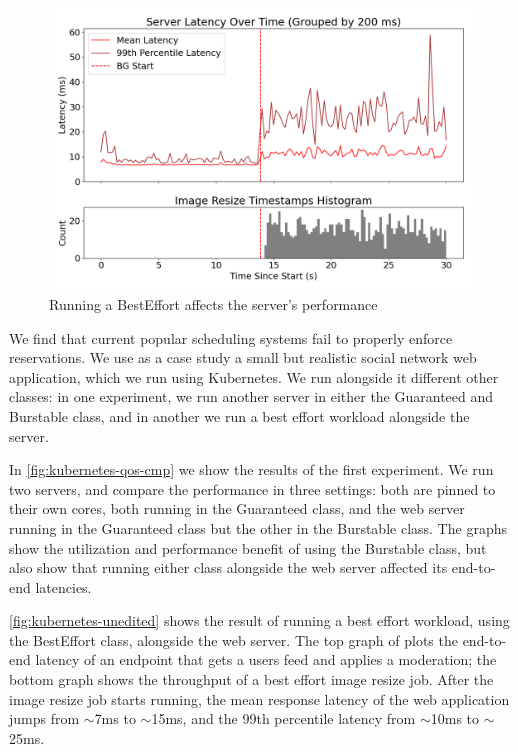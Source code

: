 \begin{figure}[t]
    \centering
    \includegraphics[width=\columnwidth]{graphs/kubernetes-unedited.png}
    \caption{Running a BestEffort affects the server's
    performance}\label{fig:kubernetes-unedited}
\end{figure}

We find that current popular scheduling systems fail to properly enforce
reservations. We use as a case study a small but realistic social network web
application, which we run using Kubernetes. We run alongside it different other
classes: in one experiment, we run another server in either the Guaranteed and
Burstable class, and in another we run a best effort workload alongside the
server. 

In \autoref{fig:kubernetes-qos-cmp} we show the results of the first experiment.
We run two servers, and compare the performance in three settings: both are
pinned to their own cores, both running in the Guaranteed class, and the web
server running in the Guaranteed class but the other in the Burstable class. The
graphs show the utilization and performance benefit of using the Burstable
class, but also show that running either class alongside the web server affected
its end-to-end latencies.

\autoref{fig:kubernetes-unedited} shows the result of running a best effort
workload, using the BestEffort class, alongside the web server. The top graph of
plots the end-to-end latency of an endpoint that gets a users feed and applies a
moderation; the bottom graph shows the throughput of a best effort image resize
job. After the image resize job starts running, the mean response latency of the
web application jumps from $\sim$7ms to $\sim$15ms, and the 99th percentile
latency from $\sim$10ms to $\sim$25ms.

